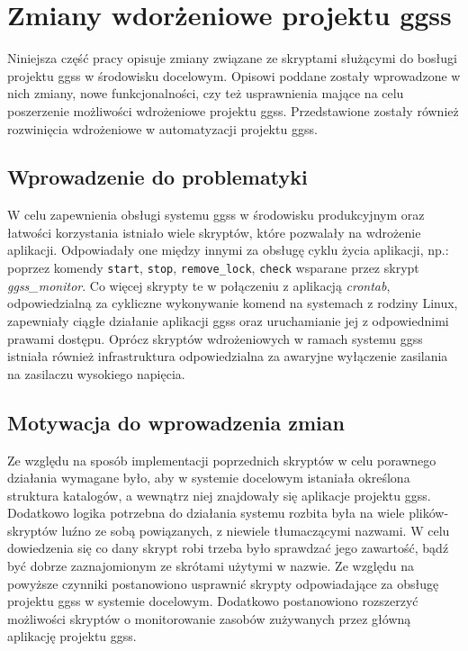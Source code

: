 \clearpage
\section{Zmiany wdorżeniowe projektu ggss}
\label{ch:scripts}


Niniejsza część pracy opisuje zmiany związane ze skryptami służącymi do bosługi projektu ggss w środowisku docelowym. Opisowi poddane zostały wprowadzone w nich zmiany, nowe funkcjonalności, czy też usprawnienia mające na celu poszerzenie możliwości wdrożeniowe projektu ggss. Przedstawione zostały również rozwinięcia wdrożeniowe w automatyzacji projektu ggss.

\subsection{Wprowadzenie do problematyki}

W celu zapewnienia obsługi systemu ggss w środowisku produkcyjnym oraz łatwości korzystania istniało wiele skryptów, które pozwalały na wdrożenie aplikacji. Odpowiadały one między innymi za obsługę cyklu życia aplikacji, np.: poprzez komendy \lstinline{start}, \lstinline{stop}, \lstinline{remove_lock}, \lstinline{check} wsparane przez skrypt \emph{ggss\_monitor}. Co więcej skrypty te w połączeniu z aplikacją \emph{crontab}, odpowiedzialną za cykliczne wykonywanie komend na systemach z rodziny Linux, zapewniały ciągłe działanie aplikacji ggss oraz uruchamianie jej z odpowiednimi prawami dostępu. Oprócz skryptów wdrożeniowych w ramach systemu ggss istniała również infrastruktura odpowiedzialna za awaryjne wyłączenie zasilania na zasilaczu wysokiego napięcia.

\subsection{Motywacja do wprowadzenia zmian}
\label{sec:scripts_motiv}

Ze względu na sposób implementacji poprzednich skryptów w celu porawnego działania wymagane było, aby w systemie docelowym istaniała określona struktura katalogów, a wewnątrz niej znajdowały się aplikacje projektu ggss. Dodatkowo logika potrzebna do działania systemu rozbita była na wiele plików-skryptów luźno ze sobą powiązanych, z niewiele tłumaczącymi nazwami. W celu dowiedzenia się co dany skrypt robi trzeba było sprawdzać jego zawartość, bądź być dobrze zaznajomionym ze skrótami użytymi w nazwie. Ze względu na powyższe czynniki postanowiono usprawnić skrypty odpowiadające za obsługę projektu ggss w systemie docelowym. Dodatkowo postanowiono rozszerzyć możliwości skryptów o monitorowanie zasobów zużywanych przez główną aplikację projektu ggss.

